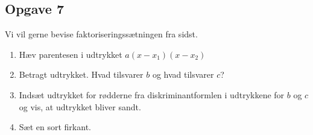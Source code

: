\subsection*{Opgave 7}
Vi vil gerne bevise faktoriseringssætningen fra sidst. 
\begin{enumerate}[label=\roman*)]
	\item Hæv parentesen i udtrykket $a(x-x_1)(x-x_2)$
	\item Betragt udtrykket. Hvad tilsvarer $b$ og hvad tilsvarer $c$?
	\item Indsæt udtrykket for rødderne fra diskriminantformlen i udtrykkene for $b$ og $c$ og vis, at 
	udtrykket bliver sandt. 
	\item Sæt en sort firkant.
\end{enumerate}